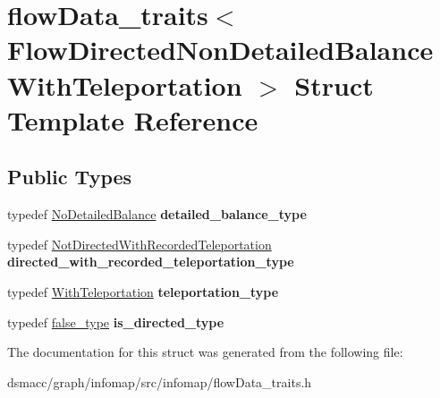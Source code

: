\hypertarget{structflowData__traits_3_01FlowDirectedNonDetailedBalanceWithTeleportation_01_4}{}\section{flow\+Data\+\_\+traits$<$ Flow\+Directed\+Non\+Detailed\+Balance\+With\+Teleportation $>$ Struct Template Reference}
\label{structflowData__traits_3_01FlowDirectedNonDetailedBalanceWithTeleportation_01_4}
\subsection*{Public Types}
\begin{DoxyCompactItemize}
\item 
\mbox{\label{structflowData__traits_3_01FlowDirectedNonDetailedBalanceWithTeleportation_01_4_ac21cdb262225e5e3d401ab47e35a6434}} 
typedef \mbox{\hyperlink{structNoDetailedBalance}{No\+Detailed\+Balance}} {\bfseries detailed\+\_\+balance\+\_\+type}
\item 
\mbox{\label{structflowData__traits_3_01FlowDirectedNonDetailedBalanceWithTeleportation_01_4_a28aeb589bebb9e6a60fefee386f52bbc}} 
typedef \mbox{\hyperlink{structNotDirectedWithRecordedTeleportation}{Not\+Directed\+With\+Recorded\+Teleportation}} {\bfseries directed\+\_\+with\+\_\+recorded\+\_\+teleportation\+\_\+type}
\item 
\mbox{\label{structflowData__traits_3_01FlowDirectedNonDetailedBalanceWithTeleportation_01_4_a339ed2ec90e8705a69297e4adcb8b940}} 
typedef \mbox{\hyperlink{structWithTeleportation}{With\+Teleportation}} {\bfseries teleportation\+\_\+type}
\item 
\mbox{\label{structflowData__traits_3_01FlowDirectedNonDetailedBalanceWithTeleportation_01_4_af4109460f1c4b9ffa37e6537734d15da}} 
typedef \mbox{\hyperlink{structfalse__type}{false\+\_\+type}} {\bfseries is\+\_\+directed\+\_\+type}
\end{DoxyCompactItemize}


The documentation for this struct was generated from the following file\+:\begin{DoxyCompactItemize}
\item 
dsmacc/graph/infomap/src/infomap/flow\+Data\+\_\+traits.\+h\end{DoxyCompactItemize}
